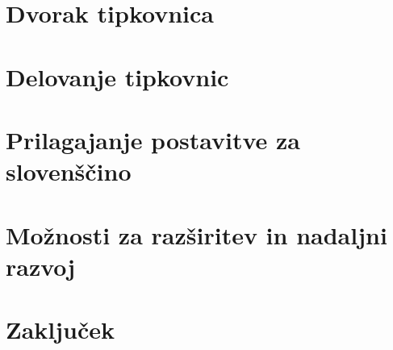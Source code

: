 \documentclass[11pt,a4paper]{article}
\begin{document}
    \section{Dvorak tipkovnica}\label{sec:dvorak}
    
    \newpage

    \section{Delovanje tipkovnic}\label{sec:delovanje}
    
    \newpage

    \section{Prilagajanje postavitve za slovenščino}\label{sec:prilagajanje}
    
    \newpage

    \section{Možnosti za razširitev in nadaljni razvoj}\label{sec:razsiritev}
    
    \newpage

    \section{Zaključek}\label{sec:zakljucek}
    
    \newpage

    
    \newpage
\end{document}
